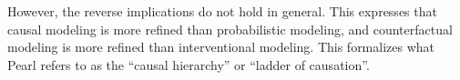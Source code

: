 However, the reverse implications do not hold in general. This expresses that causal modeling is more refined than 
probabilistic modeling, and counterfactual modeling is more refined than interventional modeling.
This formalizes what Pearl refers to as the ``causal hierarchy'' or ``ladder of causation''.
